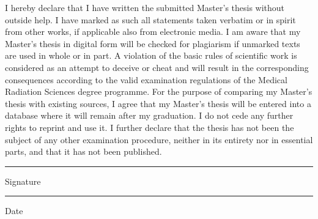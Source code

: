 I hereby declare that I have written the submitted Master's thesis without outside help. I have marked as such all statements taken verbatim or in spirit from other works, if applicable also from electronic media. I am aware that my Master's thesis in digital form will be checked for plagiarism if unmarked texts are used in whole or in part. A violation of the basic rules of scientific work is considered as an attempt to deceive or cheat and will result in the corresponding consequences according to the valid examination regulations of the Medical Radiation Sciences degree programme. For the purpose of comparing my Master's thesis with existing sources, I agree that my Master's thesis will be entered into a database where it will remain after my graduation. I do not cede any further rights to reprint and use it. I further declare that the thesis has not been the subject of any other examination procedure, neither in its entirety nor in essential parts, and that it has not been published.

\bigskip
\parbox{4cm}{\centering\hrule
\strut \centering Signature} \hfill\parbox{4cm}{\hrule
\strut \centering Date}